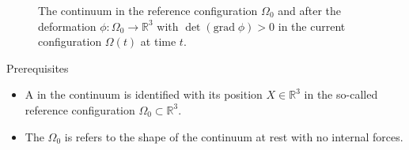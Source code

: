 \documentclass[12pt,t]{beamer}
\newcommand{\R}{\mathbb{R}}
\begin{document}
\begin{frame}{}

\begin{figure}[!htbp]
\caption[The continuum in the reference configuration $\Omega_0$ and after the deformation $\phi : \Omega_0 \rightarrow \R^3$ in the current configuration $\Omega(t)$ at time $t$.]{The continuum in the reference configuration $\Omega_0$ and after the deformation $\phi : \Omega_0 \rightarrow \R^3$ with $\det(\text{grad}\;\phi) > 0$ in the current configuration $\Omega(t)$ at time $t$.}
\label{fig::chapter2:01}
\end{figure}

\begin{block}{Prerequisites}
\begin{itemize}
\item  A  in the continuum is identified with its position $X \in \R^3$ in the so-called reference configuration $\Omega_0 \subset \R^3$.
\item The  $\Omega_0$ is refers to the shape of the continuum at rest with no internal forces. 
\end{itemize}

\end{block}

\end{frame}
\end{document}
